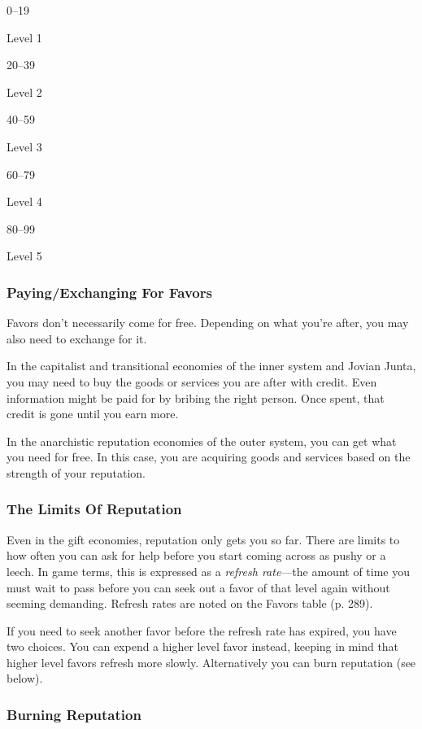 0–19

Level 1

20–39

Level 2

40–59

Level 3

60–79

Level 4

80–99

Level 5

\subsubsection{Paying/Exchanging For Favors}

Favors don't necessarily come for free. Depending on 
what you're after, you may also need to exchange for it.

In the capitalist and transitional economies of the 
inner system and Jovian Junta, you may need to buy 
the goods or services you are after with credit. Even information
might be paid for by bribing the right person.
Once spent, that credit is gone until you earn more.

In the anarchistic reputation economies of the outer 
system, you can get what you need for free. In this 
case, you are acquiring goods and services based on 
the strength of your reputation.

\subsubsection{The Limits Of Reputation}

Even in the gift economies, reputation only gets you so 
far. There are limits to how often you can ask for help 
before you start coming across as pushy or a leech. In 
game terms, this is expressed as a \textit{refresh rate}—the 
amount of time you must wait to pass before you can 
seek out a favor of that level again without seeming 
demanding. Refresh rates are noted on the Favors 
table (p. 289).

If you need to seek another favor before the refresh 
rate has expired, you have two choices. You can 
expend a higher level favor instead, keeping in mind 
that higher level favors refresh more slowly. Alternatively
you can burn reputation (see below).

\subsubsection{Burning Reputation}


